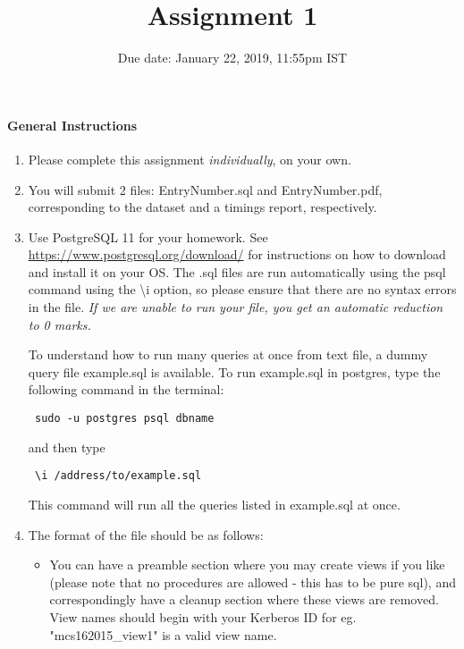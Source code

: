 \documentclass[10pt]{article}
\title{Assignment 1}
\date{Due date: January 22, 2019, 11:55pm IST}
\begin{document}
\maketitle
\paragraph*{General Instructions}


\begin{enumerate}
	
\item Please complete this assignment \emph{individually}, on your own.

\item You will submit 2 files: EntryNumber.sql and EntryNumber.pdf, corresponding to the dataset and a timings report, respectively.

\item Use PostgreSQL 11 for your homework. See \url{https://www.postgresql.org/download/} for instructions
on how to download and install it on your OS. The .sql files are run automatically using the psql command using the \textbackslash i option, so please ensure that there are no syntax errors in the file. {\it If we are unable to run your file, you get an automatic reduction to 0 marks.}


To understand how to run many queries at once from text file, a dummy query file example.sql is available. To run example.sql in postgres, type the following command in the terminal:

\begin{verbatim} sudo -u postgres psql dbname \end{verbatim}
    
    and then type 
    
\begin{verbatim} \i /address/to/example.sql \end{verbatim}

This command will run all the queries listed in example.sql at once.  

\item The format of the file should be as follows: 

\begin{itemize}
    \item You can have a preamble section where you may create views if you like (please note that no procedures are allowed - this has to be pure sql), and correspondingly have a cleanup section where these views are removed. View names should begin with your Kerberos ID for eg. "mcs162015\_view1" is a valid view name. 


\end{itemize}
\end{enumerate}
\end{document}
